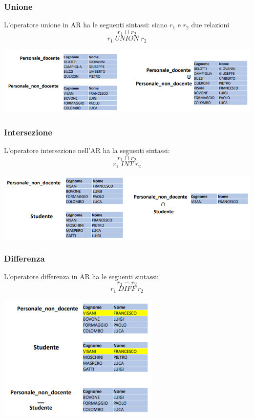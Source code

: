 \documentclass[12pt]{article}
\begin{document}
\subsubsection{Unione}
L'operatore unione in AR ha le seguenti sintassi: siano $r_1$ e $r_2$ due relazioni
$$r_1 \cup r_2$$
$$r_1 \; UNION \; r_2$$
\begin{center}
    \includegraphics[width = 1\textwidth]{Images/125.PNG}
\end{center}
\subsubsection{Intersezione}
L'operatore intersezione nell'AR ha la seguenti sintassi:
$$r_1 \cap r_2$$
$$r_1 \; INT \; r_2$$
\begin{center}
    \includegraphics[width = 1\textwidth]{Images/126.PNG}
\end{center}
\subsubsection{Differenza}
L'operatore differenza in AR ha le seguenti sintassi:
$$r_1 - r_2$$
$$r_1 \; DIFF \; r_2$$
\begin{center}
    \includegraphics[width = 0.60\textwidth]{Images/127.PNG}
\end{center}
\end{document}
